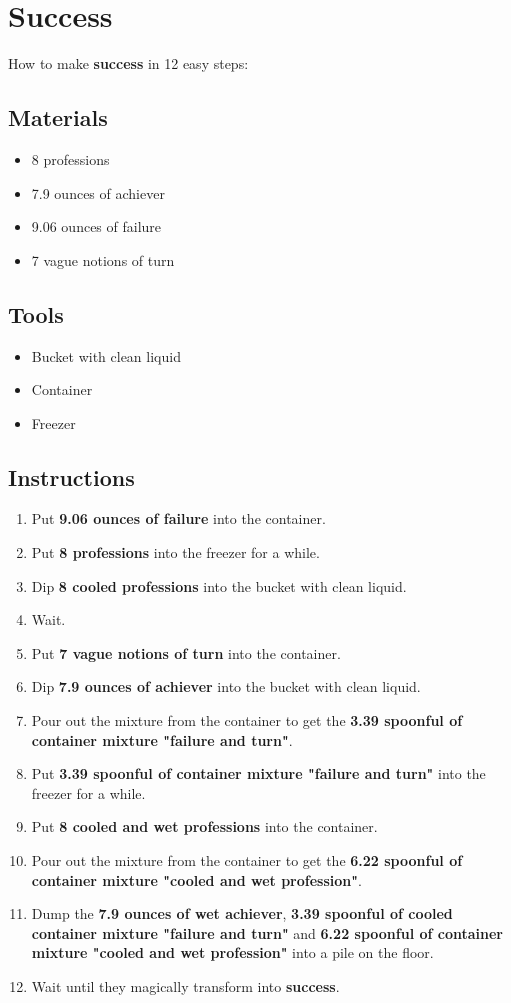 \documentclass{article}
\begin{document}
\section{Success}How to make \textbf{success} in 12 easy steps:

\subsection{Materials}\begin{itemize}
\item 
8 professions
\item 
7.9 ounces of achiever
\item 
9.06 ounces of failure
\item 
7 vague notions of turn
\end{itemize}
\subsection{Tools}\begin{itemize}
\item 
Bucket with clean liquid
\item 
Container
\item 
Freezer
\end{itemize}
\subsection{Instructions}\begin{enumerate}
\item 
Put \textbf{9.06 ounces of failure} into the container.
\item 
Put \textbf{8 professions} into the freezer for a while.
\item 
Dip \textbf{8 cooled professions} into the bucket with clean liquid.
\item 
Wait.
\item 
Put \textbf{7 vague notions of turn} into the container.
\item 
Dip \textbf{7.9 ounces of achiever} into the bucket with clean liquid.
\item 
Pour out the mixture from the container to get the \textbf{3.39 spoonful of container mixture "failure and turn"}.
\item 
Put \textbf{3.39 spoonful of container mixture "failure and turn"} into the freezer for a while.
\item 
Put \textbf{8 cooled and wet professions} into the container.
\item 
Pour out the mixture from the container to get the \textbf{6.22 spoonful of container mixture "cooled and wet profession"}.
\item 
Dump the \textbf{7.9 ounces of wet achiever}, \textbf{3.39 spoonful of cooled container mixture "failure and turn"} and \textbf{6.22 spoonful of container mixture "cooled and wet profession"} into a pile on the floor.
\item 
Wait until they magically transform into \textbf{success}.
\end{enumerate}
\newpage
\end{document}
